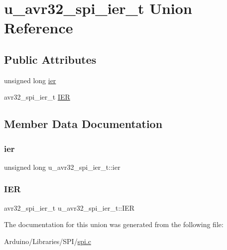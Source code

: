 \hypertarget{unionu__avr32__spi__ier__t}{}\section{u\+\_\+avr32\+\_\+spi\+\_\+ier\+\_\+t Union Reference}
\label{unionu__avr32__spi__ier__t}
\subsection*{Public Attributes}
\begin{DoxyCompactItemize}
\item 
unsigned long \hyperlink{unionu__avr32__spi__ier__t_adeeda709accca980f709f74e968d9fc1}{ier}
\item 
avr32\+\_\+spi\+\_\+ier\+\_\+t \hyperlink{unionu__avr32__spi__ier__t_ab999f7265b21cf8e7d3e1997ce8088f6}{I\+ER}
\end{DoxyCompactItemize}


\subsection{Member Data Documentation}
\mbox{\label{unionu__avr32__spi__ier__t_adeeda709accca980f709f74e968d9fc1}} 
\subsubsection{\texorpdfstring{ier}{ier}}
{\footnotesize\ttfamily unsigned long u\+\_\+avr32\+\_\+spi\+\_\+ier\+\_\+t\+::ier}

\mbox{\label{unionu__avr32__spi__ier__t_ab999f7265b21cf8e7d3e1997ce8088f6}} 
\subsubsection{\texorpdfstring{I\+ER}{IER}}
{\footnotesize\ttfamily avr32\+\_\+spi\+\_\+ier\+\_\+t u\+\_\+avr32\+\_\+spi\+\_\+ier\+\_\+t\+::\+I\+ER}



The documentation for this union was generated from the following file\+:\begin{DoxyCompactItemize}
\item 
Arduino/\+Libraries/\+S\+P\+I/\hyperlink{spi_8c}{spi.\+c}\end{DoxyCompactItemize}
